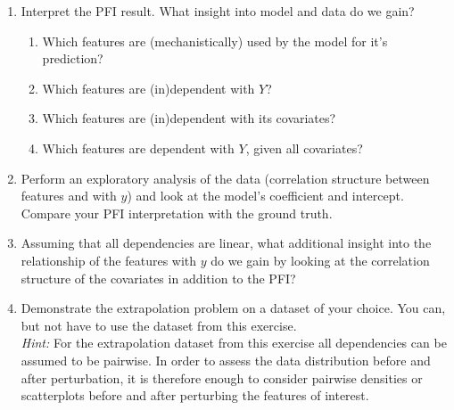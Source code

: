 {\begin{enumerate}
\begin{itemize}
    \end{itemize}
    \textit{Hint: By passing the single-feature importance function \texttt{fi\_fname} as an argument you can reuse \texttt{fi} and \texttt{n\_times} later on for other feature importance methods and only have to adjust \texttt{fi\_fname} accordingly.
    In order to allow for different function signatures you may use \texttt{f(*args, **kwargs)} in python (more info \href{https://realpython.com/python-kwargs-and-args/}{here}) and \texttt{f(...)} in R (more info \href{https://stackoverflow.com/questions/8165837/how-to-pass-a-function-and-its-arguments-through-a-wrapper-function-in-r-simila}{here}).}
    \item
    Interpret the PFI result. What insight into model and data do we gain?
    \begin{enumerate}
        \item Which features are (mechanistically) used by the model for it's prediction?
        \item Which features are (in)dependent with $Y$?
        \item Which features are (in)dependent with its covariates?
        \item Which features are dependent with $Y$, given all covariates?
    \end{enumerate}
    \item
    Perform an exploratory analysis of the data (correlation structure between features and with $y$) and look at the model's coefficient and intercept. Compare your PFI interpretation with the ground truth.
    \item
    Assuming that all dependencies are linear, what additional insight into the relationship of the features with $y$ do we gain by looking at the correlation structure of the covariates in addition to the PFI?
    \item
    Demonstrate the extrapolation problem on a dataset of your choice. You can, but not have to use the  dataset from this exercise. \\
    \textit{Hint:} For the extrapolation dataset from this exercise all dependencies can be assumed to be pairwise. In order to assess the data distribution before and after perturbation, it is therefore enough to consider pairwise densities or scatterplots before and after perturbing the features of interest.
\end{enumerate}

}
